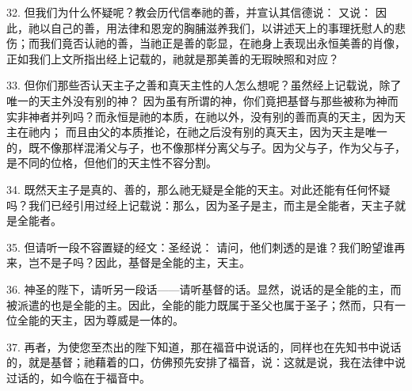 32. 但我们为什么怀疑呢？教会历代信奉祂的善，并宣认其信德说： 又说： 因此，祂以自己的善，用法律和恩宠的胸脯滋养我们，以讲述天上的事理抚慰人的悲伤；而我们竟否认祂的善，当祂正是善的彰显，在祂身上表现出永恒美善的肖像，正如我们上文所指出经上记载的，祂就是那美善的无瑕映照和对应？\par

\par

33. 但你们那些否认天主子之善和真天主性的人怎么想呢？虽然经上记载说，除了唯一的天主外没有别的神？ 因为虽有所谓的神，你们竟把基督与那些被称为神而实非神者并列吗？而永恒是祂的本质，在祂以外，没有别的善而真的天主，因为天主在祂内； 而且由父的本质推论，在祂之后没有别的真天主，因为天主是唯一的，既不像那样混淆父与子，也不像那样分离父与子。因为父与子，作为父与子，是不同的位格，但他们的天主性不容分割。\par

\par

34. 既然天主子是真的、善的，那么祂无疑是全能的天主。对此还能有任何怀疑吗？我们已经引用过经上记载说：那么，因为圣子是主，而主是全能者，天主子就是全能者。\par

35. 但请听一段不容置疑的经文：圣经说： 请问，他们刺透的是谁？我们盼望谁再来，岂不是子吗？因此，基督是全能的主，天主。\par

36. 神圣的陛下，请听另一段话——请听基督的话。显然，说话的是全能的主，而被派遣的也是全能的主。因此，全能的能力既属于圣父也属于圣子；然而，只有一位全能的天主，因为尊威是一体的。\par

37. 再者，为使您至杰出的陛下知道，那在福音中说话的，同样也在先知书中说话的，就是基督；祂藉着的口，仿佛预先安排了福音，说：这就是说，我在法律中说过话的，如今临在于福音中。\par

